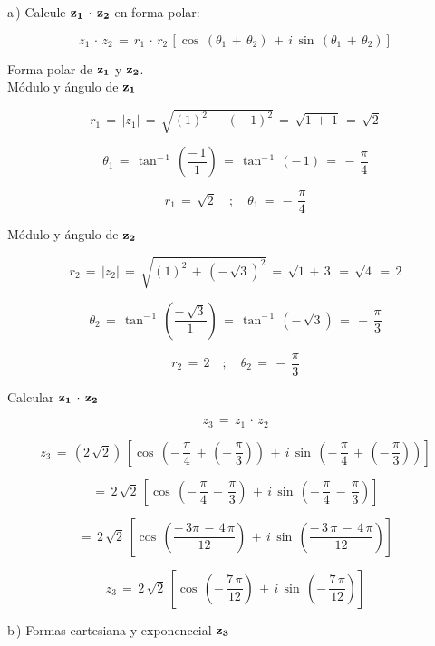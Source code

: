 \documentclass[a4paper,11pt,openany]{book}
\begin{document}
\textcolor{ao(english)}{a\,)} Calcule $\bf{z_{1}\,\cdot\,z_{2}}$ en forma polar:

$$z_{1}\,\cdot\,z_{2}\,=\,r_{1}\,\cdot\,r_{2}\,\left[\cos\,(\theta_{1}\,+\,\theta_{2})\,+\,i\,\sin\,(\theta_{1}\,+\,\theta_{2})\right]$$

\textcolor{ao(english)}{} Forma polar de $\bf{z_{1}}$ y $\bf{z_{2}}$.\\

\textcolor{ao(english)}{} Módulo y ángulo de $\bf{z_{1}}$ 

$$r_{1}\,=\,|z_{1}|\,=\,\sqrt{(1)^{2}\,+\,(-\,1)^{2}}\,=\,\sqrt{1\,+\,1}\,=\,\sqrt{2}$$

$$\theta_{1}\,=\,\tan^{-\,1}\,\left(\dfrac{-\,1}{1}\right)\,=\,\tan^{-\,1}\,(-\,1)\,=\,-\,\dfrac{\pi}{4}$$

$$\boxed{r_{1}\,=\,\sqrt{2} \quad;\quad \theta_{1}\,=\,-\,\dfrac{\pi}{4}}$$

\textcolor{ao(english)}{} Módulo y ángulo de $\bf{z_{2}}$ 

$$r_{2}\,=\,|z_{2}|\,=\,\sqrt{(1)^{2}\,+\,\left(-\,\sqrt{3}\right)^{2}}\,=\,\sqrt{1\,+\,3}\,=\,\sqrt{4\,}=\,2$$

$$\theta_{2}\,=\,\tan^{-\,1}\,\left(\dfrac{-\,\sqrt{3}}{1}\right)\,=\,\tan^{-\,1}\,(-\,\sqrt{3})\,=\,-\,\dfrac{\pi}{3}$$

$$\boxed{r_{2}\,=\,2 \quad;\quad \theta_{2}\,=\,-\,\dfrac{\pi}{3}}$$

\textcolor{ao(english)}{} Calcular $\bf{z_{1}\,\cdot\,z_{2}}$

$$z_{3}\,=\,z_{1}\,\cdot\,z_{2}$$

$$z_{3}\,=\,\left(2\,\sqrt{2}\right)\,\left[\cos\,\left(-\,\dfrac{\pi}{4}\,+\,\left(-\,\dfrac{\pi}{3}\right)\right)\,+\,i\,\sin\,\left(-\,\dfrac{\pi}{4}\,+\,\left(-\,\dfrac{\pi}{3}\right)\right)\right]$$

$$=\,2\,\sqrt{2}\,\left[\cos\,\left(-\,\dfrac{\pi}{4}\,-\,\dfrac{\pi}{3}\right)\,+\,i\,\sin\,\left(-\,\dfrac{\pi}{4}\,-\,\dfrac{\pi}{3}\right)\right]$$

$$=\,2\,\sqrt{2}\,\left[\cos\,\left(\dfrac{-\,3\pi\,-\,4\,\pi}{12}\right)\,+\,i\,\sin\,\left(\dfrac{-\,3\,\pi\,-\,4\,\pi}{12}\right)\right]$$

$$z_{3}\,=\,2\,\sqrt{2}\,\left[\cos\,\left(-\,\dfrac{7\,\pi}{12}\right)\,+\,i\,\sin\,\left(-\,\dfrac{7\,\pi}{12}\right)\right]$$

\textcolor{ao(english)}{b\,)} Formas cartesiana y exponenccial $\bf{z_{3}}$\\
\end{document}
